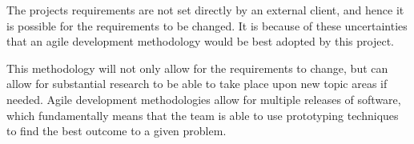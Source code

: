 The projects requirements are not set directly by an external client, and hence
it is possible for the requirements to be changed. It is because of these 
uncertainties that an agile development methodology would be best adopted by 
this project.

This methodology will not only allow for the requirements to change, but can 
allow for substantial research to be able to take place upon new topic areas if
needed. Agile development methodologies allow for multiple releases of 
software, which fundamentally means that the team is able to use prototyping 
techniques to find the best outcome to a given problem.
